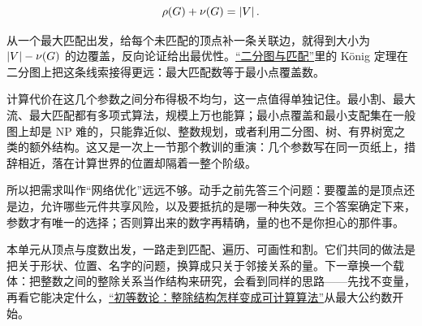 \[
\rho(G)+\nu(G)=\left|V\right|.
\]

从一个最大匹配出发，给每个未匹配的顶点补一条关联边，就得到大小为 \(\left|V\right|-\nu(G)\) 的边覆盖，反向论证给出最优性。\hyperref[sec:04-Discrete-Mathematics/03-Graph-Theory/04]{``二分图与匹配''}里的 König 定理在二分图上把这条线索接得更远：最大匹配数等于最小点覆盖数。

计算代价在这几个参数之间分布得极不均匀，这一点值得单独记住。最小割、最大流、最大匹配都有多项式算法，规模上万也能算；最小点覆盖和最小支配集在一般图上却是 NP 难的，只能靠近似、整数规划，或者利用二分图、树、有界树宽之类的额外结构。这又是一次上一节那个教训的重演：几个参数写在同一页纸上，措辞相近，落在计算世界的位置却隔着一整个阶级。

所以把需求叫作``网络优化''远远不够。动手之前先答三个问题：要覆盖的是顶点还是边，允许哪些元件共享风险，以及要抵抗的是哪一种失效。三个答案确定下来，参数才有唯一的选择；否则算出来的数字再精确，量的也不是你担心的那件事。

本单元从顶点与度数出发，一路走到匹配、遍历、可画性和割。它们共同的做法是把关于形状、位置、名字的问题，换算成只关于邻接关系的量。下一章换一个载体：把整数之间的整除关系当作结构来研究，会看到同样的思路——先找不变量，再看它能决定什么，\hyperref[ch:029]{``初等数论：整除结构怎样变成可计算算法''}从最大公约数开始。
